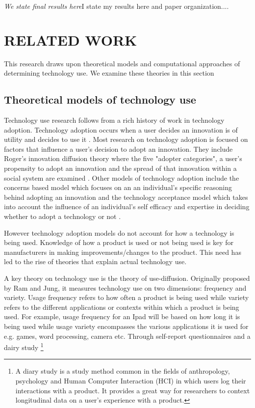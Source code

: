 \documentclass{acm_proc_article-sp}
\begin{document}
\textit{We state final results here}I state my results here and paper organization....

\section{RELATED WORK} \label{section:relatedwork}
This research draws upon theoretical models and computational approaches of determining technology use. We examine these theories in this section
\subsection{Theoretical models of technology use}
Technology use research follows from a rich history of work in technology adoption. Technology adoption occurs when a user decides an innovation is of utility and decides to use it \cite{straub2009understanding}. Most research on technology adoption is focused on factors that influence a user's decision to adopt an innovation. They include Roger's innovation diffusion theory where the five "adopter categories", a user's propensity to adopt an innovation and the spread of that innovation within a social system are examined \cite{rogers2010diffusion}. Other models of technology adoption include the concerns based model which focuses on an an individual's specific reasoning behind adopting an innovation \cite{fuller1975concerns, hall1979concerns} and the technology acceptance model \cite{legris2003people} which takes into account the influence of an individual's self efficacy and expertise in deciding whether to adopt a technology or not \cite{legris2003people}.

However technology adoption models do not account for how a technology is being used. Knowledge of how a product is used or not being used is key for manufacturers in making improvements/changes to the product. This need has led to the rise of theories that explain actual technology use.

A key theory on technology use is the theory of use-diffusion. Originally proposed by Ram and Jung\cite{ram1990conceptualization}, it measures technology use on two dimensions: frequency and variety. Usage frequency refers to how often a product is being used while variety refers to the different applications or contexts within which a product is being used. For example, usage frequency for an Ipad will be based on how long it is being used while usage variety encompasses the various applications it is used for e.g. games, word processing, camera etc. Through self-report questionnaires and a dairy study \footnote{A diary study is a study method common in the fields of anthropology, psychology and Human Computer Interaction (HCI) in which users log their interactions with a product. It provides a great way for researchers to context longitudinal data on a user's experience with a product.}
\end{document}
